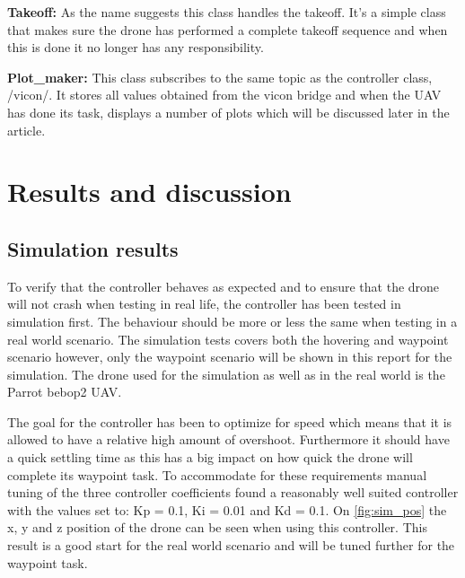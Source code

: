 \documentclass[conference]{IEEEtran}
\begin{document}
\textbf{Takeoff:} As the name suggests this class handles the takeoff. It's a simple class that makes sure the drone has performed a complete takeoff sequence and when this is done it no longer has any responsibility. 

\textbf{Plot\_maker:} This class subscribes to the same topic as the controller class, /vicon/. It stores all values obtained from the vicon bridge and when the UAV has done its task, displays a number of plots which will be discussed later in the article. 

\section{Results and discussion}


\subsection{Simulation results}
To verify that the controller behaves as expected and to ensure that the drone will not crash when testing in real life, the controller has been tested in simulation first. The behaviour should be more or less the same when testing in a real world scenario. The simulation tests covers both the hovering and waypoint scenario however, only the waypoint scenario will be shown in this report for the simulation. The drone used for the simulation as well as in the real world is the Parrot bebop2 UAV.

The goal for the controller has been to optimize for speed which means that it is allowed to have a relative high amount of overshoot. Furthermore it should have a quick settling time as this has a big impact on how quick the drone will complete its waypoint task. To accommodate for these requirements manual tuning of the three controller coefficients found a reasonably well suited controller with the values set to: Kp = 0.1, Ki = 0.01 and Kd = 0.1. On \cref{fig:sim_pos} the x, y and z position of the drone can be seen when using this controller. This result is a good start for the real world scenario and will be tuned further for the waypoint task.
\end{document}

